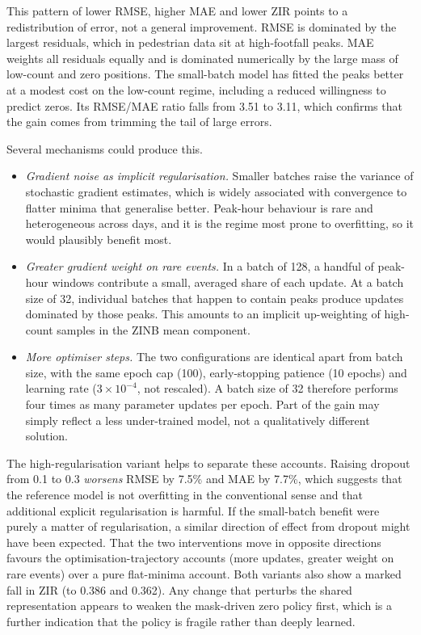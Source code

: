 This pattern of lower RMSE, higher MAE and lower ZIR points
to a redistribution of error, not a general improvement. RMSE is
dominated by the largest residuals, which in pedestrian data sit at
high-footfall peaks. MAE weights all residuals equally and is dominated
numerically by the large mass of low-count and zero positions. The
small-batch model has fitted the peaks better at a modest cost on the
low-count regime, including a reduced willingness to predict zeros. Its
RMSE/MAE ratio falls from 3.51 to 3.11, which confirms that the gain
comes from trimming the tail of large errors.

Several mechanisms could produce this.

\begin{itemize}
    \item \emph{Gradient noise as implicit regularisation.} Smaller
    batches raise the variance of stochastic gradient estimates, which
    is widely associated with convergence to flatter minima that
    generalise better. Peak-hour behaviour is rare and heterogeneous
    across days, and it is the regime most prone to overfitting, so it
    would plausibly benefit most.
    \item \emph{Greater gradient weight on rare events.} In a batch of
    128, a handful of peak-hour windows contribute a small, averaged
    share of each update. At a batch size of 32, individual batches that
    happen to contain peaks produce updates dominated by those peaks.
    This amounts to an implicit up-weighting of high-count samples in
    the ZINB mean component.
    \item \emph{More optimiser steps.} The two configurations are
    identical apart from batch size, with the same epoch cap (100),
    early-stopping patience (10 epochs) and learning rate
    ($3\times10^{-4}$, not rescaled). A batch size of 32 therefore
    performs four times as many parameter updates per epoch. Part of
    the gain may simply reflect a less under-trained model, not a
    qualitatively different solution.
\end{itemize}

The high-regularisation variant helps to separate these accounts.
Raising dropout from 0.1 to 0.3 \emph{worsens} RMSE by 7.5\% and MAE by
7.7\%, which suggests that the reference model is not overfitting in the
conventional sense and that additional explicit regularisation is
harmful. If the small-batch benefit were purely a matter of
regularisation, a similar direction of effect from dropout might have
been expected. That the two interventions move in opposite directions
favours the optimisation-trajectory accounts (more updates, greater
weight on rare events) over a pure flat-minima account. Both variants
also show a marked fall in ZIR (to 0.386 and 0.362). Any change
that perturbs the shared representation appears to weaken the
mask-driven zero policy first, which is a further indication that the
policy is fragile rather than deeply learned.

